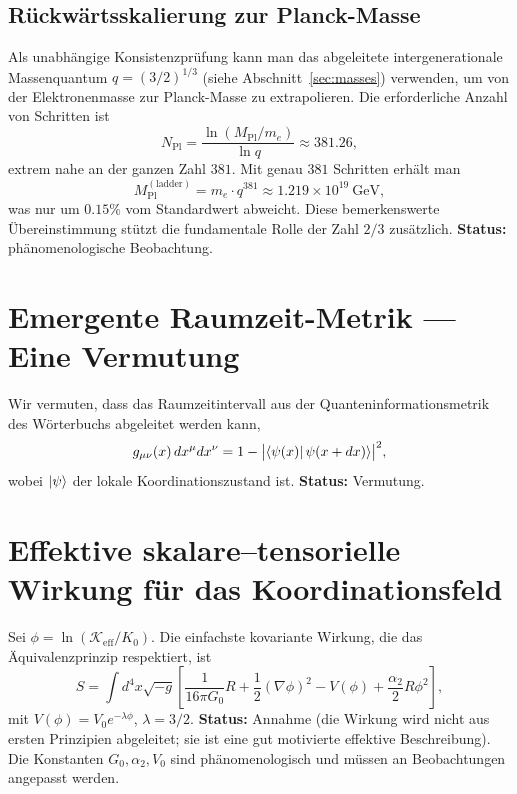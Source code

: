 \documentclass[11pt,a4paper]{article}
\newcommand{\Mpl}{M_{\mathrm{Pl}}}
\begin{document}
	\subsection{Rückwärtsskalierung zur Planck-Masse}
	Als unabhängige Konsistenzprüfung kann man das abgeleitete intergenerationale Massenquantum \(q = (3/2)^{1/3}\) (siehe Abschnitt~\ref{sec:masses}) verwenden, um von der Elektronenmasse zur Planck-Masse zu extrapolieren. Die erforderliche Anzahl von Schritten ist
	\[
	N_{\mathrm{Pl}} = \frac{\ln(\Mpl/m_e)}{\ln q} \approx 381.26,
	\]
	extrem nahe an der ganzen Zahl \(381\). Mit genau \(381\) Schritten erhält man
	\[
	\Mpl^{\mathrm{(ladder)}} = m_e \cdot q^{381} \approx 1.219\times10^{19}\ \mathrm{GeV},
	\]
	was nur um \(0.15\%\) vom Standardwert abweicht. Diese bemerkenswerte Übereinstimmung stützt die fundamentale Rolle der Zahl \(2/3\) zusätzlich. \textbf{Status:} phänomenologische Beobachtung.
	
	\section{Emergente Raumzeit-Metrik — Eine Vermutung}
	\label{sec:metric}
	Wir vermuten, dass das Raumzeitintervall aus der Quanteninformationsmetrik des Wörterbuchs abgeleitet werden kann,
	\[
	g_{\mu\nu}(x) \, dx^\mu dx^\nu = 1 - \bigl| \bra{\psi(x)} \psi(x+dx) \rangle \bigr|^2,
	\]
	wobei \(\ket{\psi}\) der lokale Koordinationszustand ist. \textbf{Status:} Vermutung.
	
	\section{Effektive skalare–tensorielle Wirkung für das Koordinationsfeld}
	\label{sec:action}
	Sei \(\phi = \ln(\mathcal{K}_{\mathrm{eff}}/K_0)\). Die einfachste kovariante Wirkung, die das Äquivalenzprinzip respektiert, ist
	\begin{equation}
		S = \int d^4x\sqrt{-g}\left[ \frac{1}{16\pi G_0} R + \frac12(\nabla\phi)^2 - V(\phi) + \frac{\alpha_2}{2}R\phi^2 \right],
		\label{eq:action}
	\end{equation}
	mit \(V(\phi) = V_0 e^{-\lambda\phi}\), \(\lambda = 3/2\). \textbf{Status:} Annahme (die Wirkung wird nicht aus ersten Prinzipien abgeleitet; sie ist eine gut motivierte effektive Beschreibung). Die Konstanten \(G_0, \alpha_2, V_0\) sind phänomenologisch und müssen an Beobachtungen angepasst werden.
	
\end{document}
